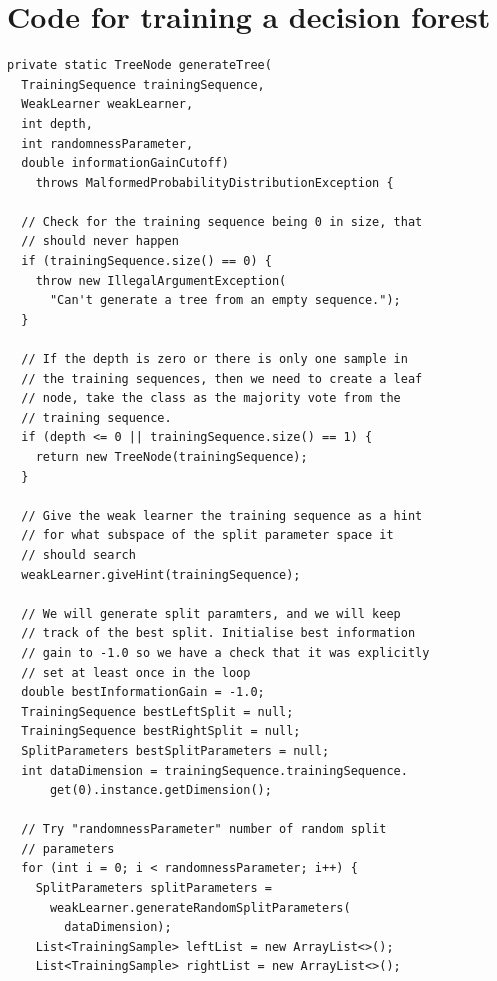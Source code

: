 \documentclass[12pt,twoside,notitlepage]{report}
\begin{document}

\cleardoublepage
\chapter{Code for training a decision forest} \label{app:train_tree}
    
    \begin{lstlisting}[caption={The implementation code for tree generation.}, label={lst:actualGenerateTree}]
private static TreeNode generateTree(
  TrainingSequence trainingSequence, 
  WeakLearner weakLearner, 
  int depth, 
  int randomnessParameter, 
  double informationGainCutoff) 
    throws MalformedProbabilityDistributionException {

  // Check for the training sequence being 0 in size, that 
  // should never happen
  if (trainingSequence.size() == 0) {
    throw new IllegalArgumentException(
      "Can't generate a tree from an empty sequence.");
  }
  
  // If the depth is zero or there is only one sample in 
  // the training sequences, then we need to create a leaf 
  // node, take the class as the majority vote from the 
  // training sequence.
  if (depth <= 0 || trainingSequence.size() == 1) {
    return new TreeNode(trainingSequence);
  }
  
  // Give the weak learner the training sequence as a hint
  // for what subspace of the split parameter space it 
  // should search
  weakLearner.giveHint(trainingSequence);
  
  // We will generate split paramters, and we will keep 
  // track of the best split. Initialise best information 
  // gain to -1.0 so we have a check that it was explicitly 
  // set at least once in the loop 
  double bestInformationGain = -1.0;
  TrainingSequence bestLeftSplit = null;
  TrainingSequence bestRightSplit = null;
  SplitParameters bestSplitParameters = null;
  int dataDimension = trainingSequence.trainingSequence.
      get(0).instance.getDimension();
  
  // Try "randomnessParameter" number of random split 
  // parameters
  for (int i = 0; i < randomnessParameter; i++) {
    SplitParameters splitParameters = 
      weakLearner.generateRandomSplitParameters(
        dataDimension);
    List<TrainingSample> leftList = new ArrayList<>();
    List<TrainingSample> rightList = new ArrayList<>();
    

\end{lstlisting}
\end{document}

